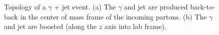 \begin{figure}[htbm]
 \centering
{}
\caption{Topology of a $\gamma$ + jet event. (a) The $\gamma$ and jet are produced back-to-back in the center of mass frame of the incoming partons. (b) The $\gamma$ and jet are boosted (along the $z$ axis into lab frame).}
 \label{fig:gjet_topology}
\end{figure}
\vspace{-0.02\textheight}

